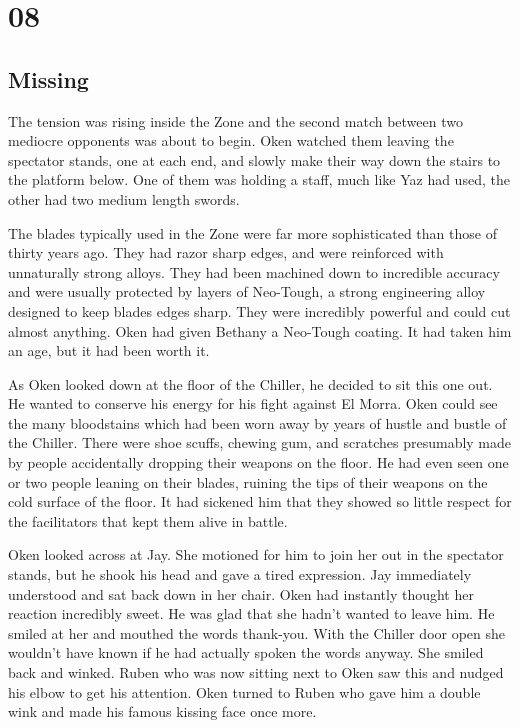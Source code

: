 \chapter{08}
\section{Missing}


The tension was rising inside the Zone and the second match between two mediocre opponents was about to begin.  Oken watched them leaving the spectator stands, one at each end, and slowly make their way down the stairs to the platform below.  One of them was holding a staff, much like Yaz had used, the other had two medium length swords.

The blades typically used in the Zone were far more sophisticated than those of thirty years ago.  They had razor sharp edges, and were reinforced with unnaturally strong alloys.  They had been machined down to incredible accuracy and were usually protected by layers of Neo-Tough, a strong engineering alloy designed to keep blades edges sharp.  They were incredibly powerful and could cut almost anything.  Oken had given Bethany a Neo-Tough coating.  It had taken him an age, but it had been worth it.

As Oken looked down at the floor of the Chiller, he decided to sit this one out.  He wanted to conserve his energy for his fight against El Morra.  Oken could see the many bloodstains which had been worn away by years of hustle and bustle of the Chiller.  There were shoe scuffs, chewing gum, and scratches presumably made by people accidentally dropping their weapons on the floor.  He had even seen one or two people leaning on their blades, ruining the tips of their weapons on the cold surface of the floor.  It had sickened him that they showed so little respect for the facilitators that kept them alive in battle.  

Oken looked across at Jay.  She motioned for him to join her out in the spectator stands, but he shook his head and gave a tired expression.  Jay immediately understood and sat back down in her chair.  Oken had instantly thought her reaction incredibly sweet.  He was glad that she hadn't wanted to leave him.  He smiled at her and mouthed the words thank-you.  With the Chiller door open she wouldn't have known if he had actually spoken the words anyway.  She smiled back and winked.  Ruben who was now sitting next to Oken saw this and nudged his elbow to get his attention.  Oken turned to Ruben who gave him a double wink and made his famous kissing face once more.

